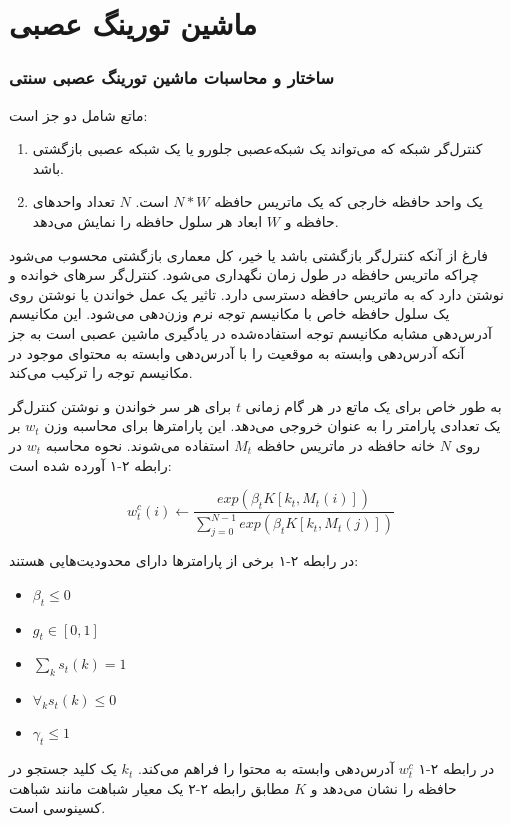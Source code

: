\chapter{ماشین تورینگ عصبی}
\subsection{ساختار و محاسبات ماشین تورینگ عصبی سنتی}
ماتع شامل دو جز است:
\begin{enumerate}
\item کنترل‌گر شبکه که می‌تواند یک شبکه‌عصبی جلورو یا یک شبکه عصبی بازگشتی باشد.
\item یک واحد حافظه خارجی که یک ماتریس حافظه $N*W$ است. $N$ تعداد واحد‌های حافظه و $W$ ابعاد هر سلول حافظه را نمایش می‌دهد.
\end{enumerate}

فارغ از آنکه کنترل‌گر بازگشتی باشد یا خیر، کل معماری بازگشتی محسوب می‌شود چراکه ماتریس حافظه در طول زمان نگهداری می‌شود. کنترل‌گر سرهای خوانده و نوشتن دارد که به ماتریس حافظه دسترسی دارد. تاثیر یک عمل خواندن یا نوشتن روی یک سلول حافظه خاص با مکانیسم توجه نرم وزن‌دهی می‌شود. این مکانیسم آدرس‌دهی مشابه مکانیسم توجه استفاده‌شده در یادگیری ماشین عصبی است به جز آنکه آدرس‌دهی وابسته به موقعیت را با آدرس‌دهی وابسته به محتوای موجود در مکانیسم توجه  را ترکیب می‌کند.

به طور خاص برای یک ماتع در هر گام زمانی $t$ برای هر سر خواندن و نوشتن کنترل‌گر یک تعدادی پارامتر را به عنوان خروجی می‌دهد. این پارامتر‌ها برای محاسبه وزن $w_t$ بر روی $N$ خانه حافظه در ماتریس حافظه $M_t$ استفاده می‌شوند. نحوه محاسبه $w_t$ در رابطه ۲-۱ آورده شده است:

\begin{equation}
w^c_t(i) \leftarrow \frac{exp(\beta_t K[k_t,M_t(i)])}{\sum_{j=0}^{N-1} exp(\beta_t K[k_t,M_t(j)])}
\end{equation}

در رابطه ۲-۱ برخی از پارامترها دارای محدودیت‌هایی هستند:
\begin{itemize}
\item $\beta_t \le 0$
\item $g_t \in [0, 1]$
\item $\sum_k s_t(k) = 1$
\item $\forall_k s_t(k) \le 0$
\item $\gamma_t \le 1$
\end{itemize}

در رابطه ۲-۱ $w_t^c$ آدرس‌دهی وابسته به محتوا را فراهم می‌کند. $k_t$ یک کلید جستجو در حافظه را نشان می‌دهد و $K$ مطابق رابطه ۲-۲ یک معیار شباهت مانند شباهت کسینوسی است.

